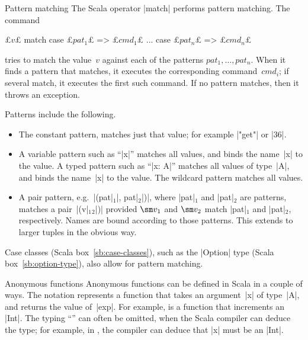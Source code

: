 \begin{scalaBox}{Pattern matching}
\label{sb:pattern-matching}
The Scala operator |match| performs pattern matching.  The command
%
\begin{scala}
  £$v$£ match{
    case £$pat_1$£ => £$cmd_1$£
    ...
    case £$pat_n$£ => £$cmd_n$£
  }
\end{scala}
tries to match the value~$v$ against each of the patterns $pat_1, \ldots,
pat_n$.  When it finds a pattern that matches, it executes the corresponding
command~$cmd_i$; if several match, it executes the first such command.  If no
pattern matches, then it throws an exception.

Patterns include the following.
\begin{itemize}
\item The constant pattern, matches just that value; for example |"get"| or
  |36|.

\item A variable pattern such as ``|x|'' matches all values, and binds the
name~|x| to the value.  A typed pattern such as ``|x: A|'' matches all values
of type~|A|, and binds the name~|x| to the value.  The wildcard pattern
\SCALA{\_} matches all values.  

\item A pair pattern, e.g.~|(pat|$_1$|, pat|$_2$|)|, where |pat|$_1$ and
  |pat|$_2$ are patterns, matches a pair~|(v|$_1$$_2$|)| provided
  $\sm v_1$ and $\sm v_2$ match |pat|$_1$ and |pat|$_2$, respectively.  Names
  are bound according to those patterns.  This extends to larger tuples in the
  obvious way.
\end{itemize}
%
Case classes (Scala box~\ref{sb:case-classes}), such as the |Option| type
(Scala box~\ref{sb:option-type}), also allow for pattern matching.
\end{scalaBox}


\begin{scalaBox}{Anonymous functions}
\label{sb:anon-function}
Anonymous functions can be defined in Scala in a couple of ways.  The notation
 represents a function that takes an argument~|x| of
type~|A|, and returns the value of~|exp|.  For example,  is a function that increments an |Int|.  The typing ``'' can
often be omitted, when the Scala compiler can deduce the type; for example, in
, the compiler can deduce that |x| must be an
|Int|.
\end{scalaBox}

